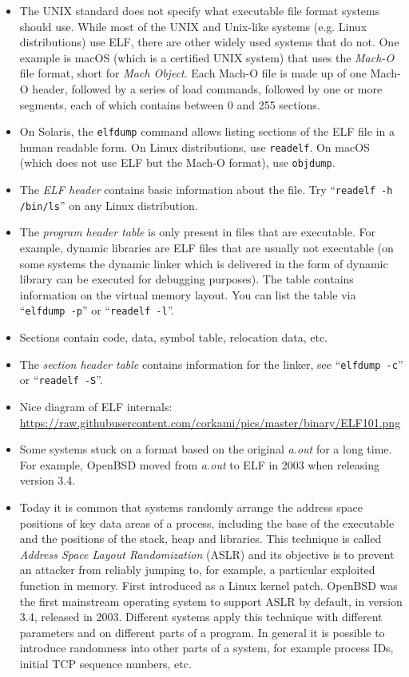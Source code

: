 \begin{itemize}
\item The UNIX standard does not specify what executable file format systems
should use.  While most of the UNIX and Unix-like systems (e.g. Linux
distributions) use ELF, there are other widely used systems that do not. One
example is macOS (which is a certified UNIX system) that uses the \emph{Mach-O}
file format, short for \emph{Mach Object}. Each Mach-O file is made
up of one Mach-O header, followed by a series of load commands, followed by one
or more segments, each of which contains between 0 and 255 sections.
\item On Solaris, the \texttt{elfdump} command allows listing sections of the
ELF file in a human readable form. On Linux distributions, use \texttt{readelf}.
On macOS (which does not use ELF but the Mach-O format), use \texttt{objdump}.
\item The \emph{ELF header} contains basic information about the file.  Try
``\texttt{readelf -h /bin/ls}'' on any Linux distribution.
\item The \emph{program header table} is only present in files that are
executable.  For example, dynamic libraries are ELF files that are usually not
executable (on some systems the dynamic linker which is delivered in the form
of dynamic library can be executed for debugging purposes).
The table contains information on the virtual memory layout.  You can list
the table via ``\texttt{elfdump~-p}'' or ``\texttt{readelf~-l}''.
\item Sections contain code, data, symbol table, relocation data, etc.
\item The \emph{section header table} contains information for the linker, see
``\texttt{elfdump -c}'' or ``\texttt{readelf~-S}''.
\item Nice diagram of ELF internals:
\url{https://raw.githubusercontent.com/corkami/pics/master/binary/ELF101.png}
\item Some systems stuck on a format based on the original \emph{a.out} for a
long time.  For example, OpenBSD moved from \emph{a.out} to ELF in 2003 when
releasing version 3.4.
\item Today it is common that systems randomly arrange the address space
positions of key data areas of a process, including the base of the executable
and the positions of the stack, heap and libraries.  This technique is called
\emph{Address Space Layout Randomization} (ASLR) and its objective is to prevent
an attacker from reliably jumping to, for example, a particular exploited
function in memory.  First introduced as a Linux kernel patch.  OpenBSD was the
first mainstream operating system to support ASLR by default, in version 3.4,
released in 2003.  Different systems apply this technique with different
parameters and on different parts of a program.  In general it is possible to
introduce randomness into other parts of a system, for example process IDs,
initial TCP sequence numbers, etc.
\end{itemize}

